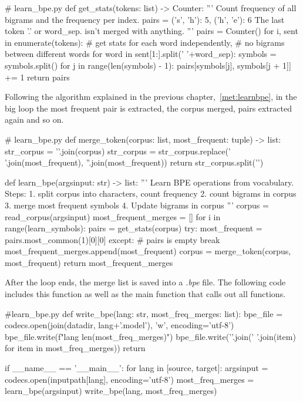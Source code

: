 \begin{python}
# learn_bpe.py
def get_stats(tokens: list) -> Counter:
  '''
  Count frequency of all bigrams and the frequency per index.
  pairs = {
    ('s', 'h'): 5,
    ('h', 'e'): 6
  }
  The last token '.' or word_sep. isn't merged with anything.
  '''
  pairs = Counter()
  for i, sent in enumerate(tokens):
    # get stats for each word independently, 
    # no bigrams between different words
    for word in sent[1:].split(' '+word_sep):
      symbols = symbols.split()
      for j in range(len(symbols) - 1):
        pairs[symbols[j], symbols[j + 1]] += 1
  return pairs
\end{python}

Following the algorithm explained in the previous chapter,~\ref{met:learnbpe}, in the big loop the most frequent pair is extracted, the corpus merged, pairs extracted again and so on.

\begin{python}
# learn_bpe.py
def merge_token(corpus: list, most_frequent: tuple) -> list:
  str_corpus = '\n'.join(corpus)
  str_corpus = str_corpus.replace(' '.join(most_frequent), ''.join(most_frequent))
  return str_corpus.split('\n')

def learn_bpe(argsinput: str) -> list:
  '''
  Learn BPE operations from vocabulary. Steps:
  1. split corpus into characters, count frequency
  2. count bigrams in corpus
  3. merge most frequent symbols
  4. Update bigrams in corpus 
  '''
  corpus = read_corpus(argsinput)
  most_frequent_merges = []
  for i in range(learn_symbols):
    pairs = get_stats(corpus)
    try:
      most_frequent = pairs.most_common(1)[0][0]
    except:
      # pairs is empty
      break
    most_frequent_merges.append(most_frequent)
    corpus = merge_token(corpus, most_frequent)
  return most_frequent_merges
\end{python}

After the loop ends, the merge list is saved into a \emph{.bpe} file. The following code includes this function as well as the main function that calls out all functions.

\begin{python}
#learn_bpe.py
def write_bpe(lang: str, most_freq_merges: list):
  bpe_file = codecs.open(join(datadir, lang+'.model'), 'w', encoding='utf-8')
  bpe_file.write(f"{lang} {len(most_freq_merges)}\n")
  bpe_file.write('\n'.join(' '.join(item) for item in most_freq_merges))
  return

if __name__ == '__main__':
  for lang in [source, target]:
    argsinput = codecs.open(inputpath[lang], encoding='utf-8')
    most_freq_merges = learn_bpe(argsinput)
    write_bpe(lang, most_freq_merges)
\end{python}

